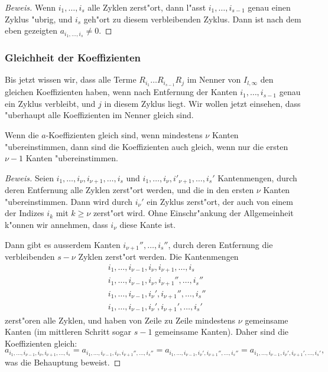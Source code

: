 \begin{proof}[Beweis]
Wenn $i_1,\dots,i_s$ alle Zyklen zerst"ort, dann l"asst
$i_1,\dots,i_{s-1}$ genau einen Zyklus "ubrig, und $i_s$ 
geh"ort zu diesem verbleibenden Zyklus. Dann ist nach dem
eben gezeigten $a_{i_1,\dots,i_s}\ne 0$.
\end{proof}

\subsubsection{Gleichheit der Koeffizienten}
Bis jetzt wissen wir, dass alle Terme $R_{i_1}\dots R_{i_{s-1}}R_j$
im Nenner von $I_{l,\infty}$ den gleichen Koeffizienten haben,
wenn nach Entfernung der Kanten $i_1,\dots,i_{s-1}$ genau ein
Zyklus verbleibt, und $j$ in diesem Zyklus liegt. Wir wollen jetzt
einsehen, dass "uberhaupt alle Koeffizienten im Nenner gleich sind.

\begin{hilfssatz}
\label{gleichekoef-induktionsschritt}
Wenn die $a$-Koeffizienten gleich sind,
wenn mindestens $\nu$ Kanten "ubereinstimmen,
dann sind die Koeffizienten auch gleich,
wenn nur die ersten $\nu-1$ Kanten "ubereinstimmen.
\end{hilfssatz}

\begin{proof}[Beweis]
Seien
$i_1,\dots,i_\nu,i_{\nu+1},\dots,i_s$
und
$i_1,\dots,i_{\nu},i'_{\nu+1},\dots,i_s'$
Kantenmengen,
durch deren
Entfernung alle Zyklen zerst"ort werden,
und die in den ersten $\nu$ Kanten "ubereinstimmen.
Dann wird durch $i_\nu'$ ein Zyklus zerst"ort, der auch von einem
der Indizes $i_{k}$ mit $k\ge\nu$ zerst"ort wird. Ohne Einschr"ankung
der Allgemeinheit k"onnen wir annehmen, dass $i_{\nu}$ diese Kante ist.

Dann gibt es ausserdem Kanten $i_{\nu+1}'',\dots,i_s''$, durch deren
Entfernung die verbleibenden $s-\nu$ Zyklen zerst"ort werden. Die Kantenmengen
\begin{align*}
&i_1,\dots,i_{\nu-1},i_{\nu},i_{\nu+1},\dots,i_s\\
&i_1,\dots,i_{\nu-1},i_{\nu},i_{\nu+1}'',\dots,i_s''\\
&i_1,\dots,i_{\nu-1},i_{\nu}',i_{\nu+1}'',\dots,i_s''\\
&i_1,\dots,i_{\nu-1},i_{\nu}',i_{\nu+1}',\dots,i_s'
\end{align*}
zerst"oren alle Zyklen, und haben von Zeile zu Zeile mindestens
$\nu$ gemeinsame Kanten (im mittleren Schritt sogar $s-1$
gemeinsame Kanten). Daher sind die Koeffizienten gleich:
\[
a_{i_1,\dots,i_{\nu-1},i_{\nu},i_{\nu+1},\dots,i_s}
=
a_{i_1,\dots,i_{\nu-1},i_{\nu},i_{\nu+1}'',\dots,i_s''}
=
a_{i_1,\dots,i_{\nu-1},i_{\nu}',i_{\nu+1}'',\dots,i_s''}
=
a_{i_1,\dots,i_{\nu-1},i_{\nu}',i_{\nu+1}',\dots,i_s'},
\]
was die Behauptung beweist.
\end{proof}

